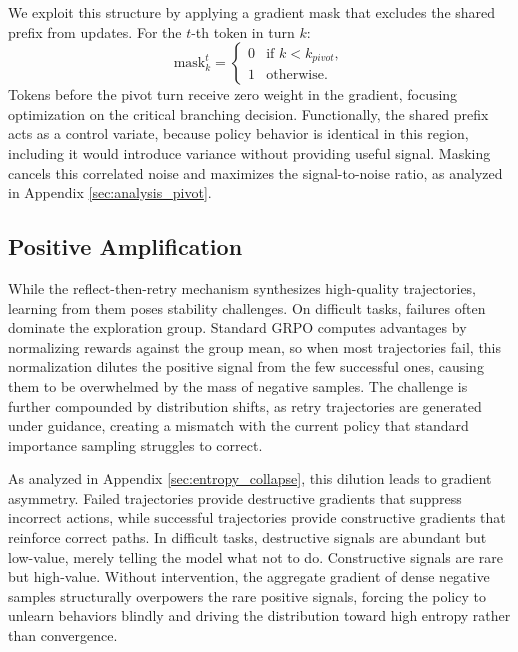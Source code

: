 \documentclass{article} %
\theoremstyle{definition}
\theoremstyle{remark}
\begin{document}
We exploit this structure by applying a gradient mask that excludes the shared prefix from updates. For the $t$-th token in turn $k$:
\begin{equation}
    \text{mask}_k^t = \begin{cases}
        0 & \text{if } k < k_{pivot}, \\
        1 & \text{otherwise}.
    \end{cases}
\end{equation}
Tokens before the pivot turn receive zero weight in the gradient, focusing optimization on the critical branching decision. Functionally, the shared prefix acts as a control variate, because policy behavior is identical in this region, including it would introduce variance without providing useful signal. Masking cancels this correlated noise and maximizes the signal-to-noise ratio, as analyzed in Appendix \ref{sec:analysis_pivot}.

\subsection{Positive Amplification}
\label{sec:positive_amplification}
While the reflect-then-retry mechanism synthesizes high-quality trajectories, learning from them poses stability challenges. On difficult tasks, failures often dominate the exploration group. Standard GRPO computes advantages by normalizing rewards against the group mean, so when most trajectories fail, this normalization dilutes the positive signal from the few successful ones, causing them to be overwhelmed by the mass of negative samples. The challenge is further compounded by distribution shifts, as retry trajectories are generated under guidance, creating a mismatch with the current policy that standard importance sampling struggles to correct.

As analyzed in Appendix \ref{sec:entropy_collapse}, this dilution leads to gradient asymmetry. Failed trajectories provide destructive gradients that suppress incorrect actions, while successful trajectories provide constructive gradients that reinforce correct paths. In difficult tasks, destructive signals are abundant but low-value, merely telling the model what not to do. Constructive signals are rare but high-value. Without intervention, the aggregate gradient of dense negative samples structurally overpowers the rare positive signals, forcing the policy to unlearn behaviors blindly and driving the distribution toward high entropy rather than convergence.
\end{document}
